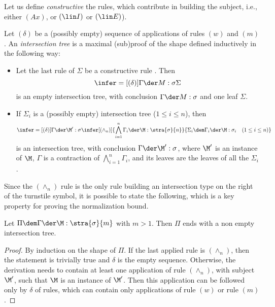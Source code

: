 Let us define {\em constructive} the rules, which contribute in building the subject, i.e., either $(Ax)$, or $(\lin I)$ or $(\lin E)$). 

\begin{definition}
Let $(\delta)$ be a (possibly empty) sequence of applications of rules $(w)$ and $(m)$. An {\em intersection tree} is a maximal (sub)proof of the shape defined inductively in the following way:
\begin{itemize}
\item Let the last rule of $\Sigma$ be a constructive rule . Then
\small
$$
\infer=[(\delta)]{\Gamma \der M:\sigma }{\Sigma}
$$
\normalsize
is an empty intersection tree, with conclusion $\Gamma \der M:\sigma$ and one leaf $\Sigma$.
\item 
If $\Sigma_i$ is a (possibly empty) intersection tree ($1\leq i\leq n$), then
\small
$$
\infer=[(\delta)]{\Gamma \der \M':\sigma }{\infer[(\wedge_n)] {\bigwedge_{i=1}^n \Gamma_i \der \M: \stra{\sigma}{n}}
{\Sigma_i\dem\Gamma_{i} \der \M: \sigma_{i} \quad (1 \leq i \leq n)}}
$$
\normalsize
is an intersection tree, with conclusion $\Gamma\der \M':\sigma$, where $\M'$ is an instance of $\M$, $\Gamma$ is a contraction of $\bigwedge_{i=1}^n \Gamma_i $, and its leaves are the leaves of all the $\Sigma_i$.
\end{itemize}
\end{definition}

Since the $(\wedge_n)$ rule is the only rule building an intersection type on the right of the turnstile symbol, it is possible to state the following, which is a key property for proving the normalization bound.


\begin{property}
\label{prop:stra}
Let $\Pi \dem \Gamma \der \M: \stra{\sigma}{m}$ with $m > 1$. Then $\Pi$ ends with a non empty intersection tree. 
\end{property}

\begin{proof}
By induction on the shape of $\Pi$.
If the last applied rule is $(\wedge_n)$, then the statement is trivially true and $\delta$ is the empty sequence.
Otherwise, the derivation needs to contain at least one application of rule $(\wedge_n)$, with subject $\M'$, such that
$\M$ is an instance of $\M'$. Then this application can be followed only by $\delta$ of rules, which can contain only applications of rule $(w)$ or rule $(m)$.
\end{proof}


